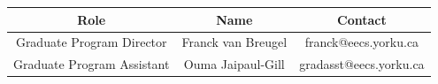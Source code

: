 \documentclass[fontsize=12pt,paper=letter,twoside]{scrartcl}
\begin{document}
\begin{center}
\begin{tabular}{ |c |c |c | } \hline
 \textbf{Role} & \textbf{Name} & \textbf{Contact} \\ \hline
 Graduate Program Director & Franck van Breugel & franck@eecs.yorku.ca \\ \hline
 Graduate Program Assistant & Ouma Jaipaul-Gill & gradasst@eecs.yorku.ca \\ \hline
\end{tabular}
\end{center}
\end{document}

